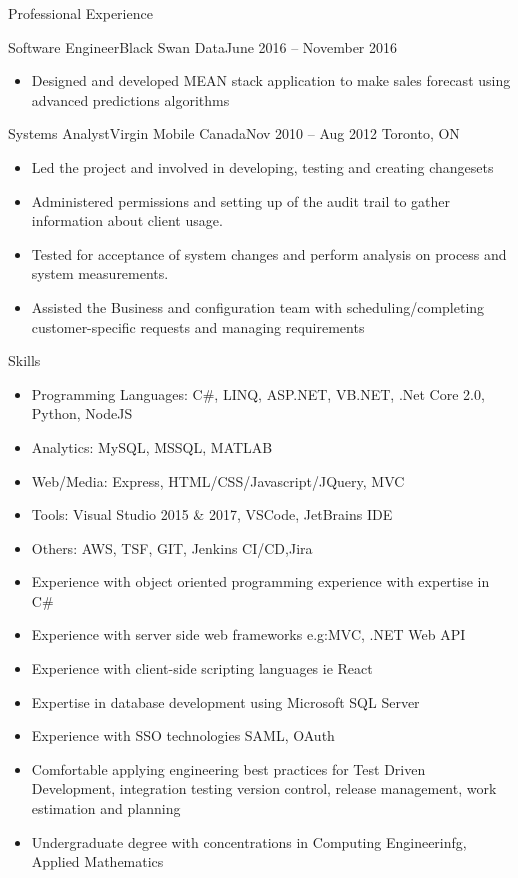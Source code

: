 \documentclass[]{mcdowellcv}
\begin{document}
\begin{cvsection}{Professional Experience}
\begin{cvsubsection}{Software Engineer}{Black Swan Data}{June 2016 -- November 2016}
\begin{itemize}
			\item Designed and developed MEAN stack application to make sales forecast using advanced predictions algorithms
		\end{itemize}
	\end{cvsubsection}
	\begin{cvsubsection}{Systems Analyst}{Virgin Mobile Canada}{Nov 2010 -- Aug 2012}
		Toronto, ON
		\begin{itemize}%
			\item Led the project and involved in developing, testing and creating changesets
			\item Administered permissions and setting up of the audit trail to gather information about client usage.
			\item Tested for acceptance of system changes and perform analysis on process and system measurements.
			\item Assisted the Business and configuration team with scheduling/completing customer-specific requests and managing requirements
		\end{itemize}
	\end{cvsubsection}
\end{cvsection}
\begin{cvsection}{Skills}
	\begin{cvsubsection}{}{}{}
		\begin{itemize}
			\item Programming Languages: C\#, LINQ, ASP.NET, VB.NET, .Net Core 2.0, Python, NodeJS
			\item Analytics: MySQL, MSSQL, MATLAB
			\item Web/Media: Express, HTML/CSS/Javascript/JQuery, MVC
			\item Tools: Visual Studio 2015 \& 2017, VSCode, JetBrains IDE
			\item Others: AWS, TSF, GIT, Jenkins CI/CD,Jira
			\item Experience with object oriented programming experience with expertise in C\#
			\item Experience with server side web frameworks e.g:MVC, .NET Web API
			\item Experience with client-side scripting languages ie React
			\item Expertise in database development using Microsoft SQL Server
			\item Experience with SSO technologies SAML, OAuth
			\item Comfortable applying engineering best practices for Test Driven Development, integration testing version control, release management, work estimation and planning
			\item Undergraduate degree with concentrations in Computing Engineerinfg, Applied Mathematics
		\end{itemize}
	\end{cvsubsection}
\end{cvsection}
\end{document}

